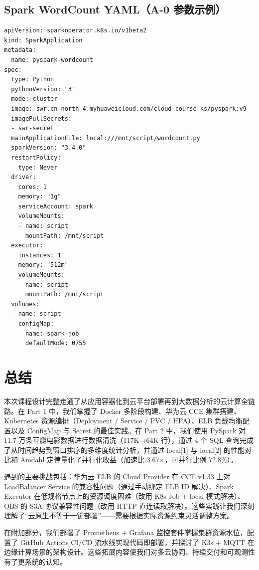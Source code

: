 \documentclass[12pt,a4paper]{ctexart}
\begin{document}
\subsection{Spark WordCount YAML（A-0 参数示例）}
\begin{lstlisting}[language={}]
apiVersion: sparkoperator.k8s.io/v1beta2
kind: SparkApplication
metadata:
  name: pyspark-wordcount
spec:
  type: Python
  pythonVersion: "3"
  mode: cluster
  image: swr.cn-north-4.myhuaweicloud.com/cloud-course-ks/pyspark:v9
  imagePullSecrets:
  - swr-secret
  mainApplicationFile: local:///mnt/script/wordcount.py
  sparkVersion: "3.4.0"
  restartPolicy:
    type: Never
  driver:
    cores: 1
    memory: "1g"
    serviceAccount: spark
    volumeMounts:
    - name: script
      mountPath: /mnt/script
  executor:
    instances: 1
    memory: "512m"
    volumeMounts:
    - name: script
      mountPath: /mnt/script
  volumes:
  - name: script
    configMap:
      name: spark-job
      defaultMode: 0755
\end{lstlisting}

\section{总结}

本次课程设计完整走通了从应用容器化到云平台部署再到大数据分析的云计算全链路。在 Part 1 中，我们掌握了 Docker 多阶段构建、华为云 CCE 集群搭建、Kubernetes 资源编排（Deployment / Service / PVC / HPA）、ELB 负载均衡配置以及 ConfigMap 与 Secret 的最佳实践。在 Part 2 中，我们使用 PySpark 对 11.7 万条豆瓣电影数据进行数据清洗（117K→64K 行），通过 4 个 SQL 查询完成了从时间趋势到窗口排序的多维度统计分析，并通过 local[1] 与 local[2] 的性能对比和 Amdahl 定律量化了并行化收益（加速比 3.67×，可并行比例 72.8\%）。

遇到的主要挑战包括：华为云 ELB 的 Cloud Provider 在 CCE v1.33 上对 LoadBalancer Service 的兼容性问题（通过手动绑定 ELB ID 解决）、Spark Executor 在低规格节点上的资源调度困难（改用 K8s Job + local 模式解决）、OBS 的 S3A 协议兼容性问题（改用 HTTP 直连读取解决）。这些实践让我们深刻理解了“云原生不等于一键部署”——需要根据实际资源约束灵活调整方案。

在附加部分，我们部署了 Prometheus + Grafana 监控套件掌握集群资源水位，配置了 GitHub Actions CI/CD 流水线实现代码即部署，并探讨了 K3s + MQTT 在边缘计算场景的架构设计。这些拓展内容使我们对多云协同、持续交付和可观测性有了更系统的认知。
\end{document}

